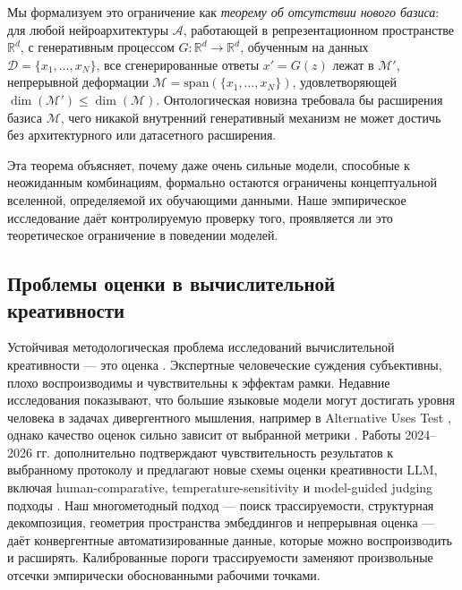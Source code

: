 \documentclass[sn-mathphys-num]{sn-jnl}
\begin{document}
Мы формализуем это ограничение как \emph{теорему об отсутствии нового базиса}: для любой нейроархитектуры $\mathcal{A}$, работающей в репрезентационном пространстве $\mathbb{R}^{d}$, с генеративным процессом $G\colon \mathbb{R}^{d} \to \mathbb{R}^{d}$, обученным на данных $\mathcal{D} = \{x_1,\ldots,x_N\}$, все сгенерированные ответы $x' = G(z)$ лежат в $\mathcal{M}'$, непрерывной деформации $\mathcal{M} = \mathrm{span}(\{x_1,\ldots,x_N\})$, удовлетворяющей $\dim(\mathcal{M}') \leq \dim(\mathcal{M})$. Онтологическая новизна требовала бы расширения базиса $\mathcal{M}$, чего никакой внутренний генеративный механизм не может достичь без архитектурного или датасетного расширения.

Эта теорема объясняет, почему даже очень сильные модели, способные к неожиданным комбинациям, формально остаются ограничены концептуальной вселенной, определяемой их обучающими данными. Наше эмпирическое исследование даёт контролируемую проверку того, проявляется ли это теоретическое ограничение в поведении моделей.

\subsection{Проблемы оценки в вычислительной креативности}

Устойчивая методологическая проблема исследований вычислительной креативности --- это оценка \cite{wiggins2006preliminary,colton2012computational}. Экспертные человеческие суждения субъективны, плохо воспроизводимы и чувствительны к эффектам рамки. Недавние исследования показывают, что большие языковые модели могут достигать уровня человека в задачах дивергентного мышления, например в Alternative Uses Test \cite{stevenson2022gpt}, однако качество оценок сильно зависит от выбранной метрики \cite{organisciak2023beyond}. Работы 2024--2026 гг. дополнительно подтверждают чувствительность результатов к выбранному протоколу и предлагают новые схемы оценки креативности LLM, включая human-comparative, temperature-sensitivity и model-guided judging подходы \cite{zhao2024assessing,wang2024canai,peeperkorn2024temperature,bellemare2024divergent,ismayilzada2024shortstory,nakajima2026beyonddivergent,olson2024steering}. Наш многометодный подход --- поиск трассируемости, структурная декомпозиция, геометрия пространства эмбеддингов и непрерывная оценка --- даёт конвергентные автоматизированные данные, которые можно воспроизводить и расширять. Калиброванные пороги трассируемости заменяют произвольные отсечки эмпирически обоснованными рабочими точками.
\end{document}
